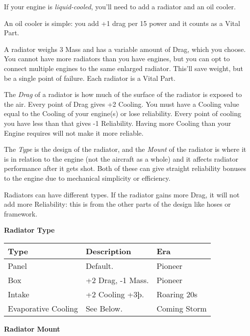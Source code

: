 \documentclass{article}
\begin{document}
If your engine is \emph{liquid-cooled}, you'll need to add a radiator
and an oil cooler.

An oil cooler is simple: you add +1 drag per 15 power and it counts as a
Vital Part.

A radiator weighs 3 Mass and has a variable amount of Drag, which you
choose. You cannot have more radiators than you have engines, but you
can opt to connect multiple engines to the same enlarged radiator.
This'll save weight, but be a single point of failure. Each radiator is
a Vital Part.

The \emph{Drag }of a radiator is how much of the surface of the radiator
is exposed to the air. Every point of Drag gives +2 Cooling. You must
have a Cooling value equal to the Cooling of your engine(s) or lose
reliability. Every point of cooling you have less than that gives -1
Reliability. Having more Cooling than your Engine requires will not make
it more reliable.

The \emph{Type }is the design of the radiator, and the \emph{Mount} of
the radiator is where it is in relation to the engine (not the aircraft
as a whole) and it affects radiator performance after it gets shot. Both
of these can give straight reliability bonuses to the engine due to
mechanical simplicity or efficiency.

Radiators can have different types. If the radiator gains more Drag, it
will not add more Reliability: this is from the other parts of the
design like hoses or framework.

\textbf{Radiator Type}

\begin{tabular}{|l|l|l|}
  \hline
  Type                & Description       & Era          \\\hline
  Panel               & Default.          & Pioneer      \\\hline
  Box                 & +2 Drag, -1 Mass. & Pioneer      \\\hline
  Intake              & +2 Cooling +3þ.   & Roaring 20s  \\\hline
  Evaporative Cooling & See Below.        & Coming Storm \\\hline
\end{tabular}

\textbf{Radiator Mount}
\end{document}
